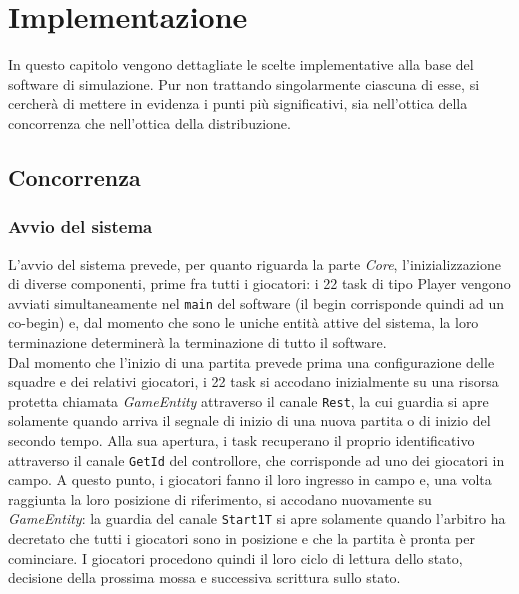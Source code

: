 
\section{Implementazione}
\label{sec:implementazione}

In questo capitolo vengono dettagliate le scelte implementative alla base del software di simulazione. Pur non trattando singolarmente ciascuna di esse, si cercherà di mettere in evidenza i punti più significativi, sia nell'ottica della concorrenza che nell'ottica della distribuzione.

\subsection{Concorrenza}
\label{sec:implemetazione_concorrenza}

\subsubsection{Avvio del sistema}
\label{sec:implementazione_concorrenza_avvio_sistema}

L'avvio del sistema prevede, per quanto riguarda la parte \emph{Core}, l'inizializzazione di diverse componenti, prime fra tutti i giocatori: i 22 task di tipo Player vengono avviati simultaneamente nel \verb+main+ del software (il begin corrisponde quindi ad un co-begin) e, dal momento che sono le uniche entità attive del sistema, la loro terminazione determinerà la terminazione di tutto il software.\\

Dal momento che l'inizio di una partita prevede prima una configurazione delle squadre e dei relativi giocatori, i 22 task si accodano inizialmente su una risorsa protetta chiamata \emph{GameEntity} attraverso il canale \verb+Rest+, la cui guardia si apre solamente quando arriva il segnale di inizio di una nuova partita o di inizio del secondo tempo. Alla sua apertura, i task recuperano il proprio identificativo attraverso il canale \verb+GetId+ del controllore, che corrisponde ad uno dei giocatori in campo. A questo punto, i giocatori fanno il loro ingresso in campo e, una volta raggiunta la loro posizione di riferimento, si accodano nuovamente su \emph{GameEntity}: la guardia del canale \verb+Start1T+ si apre solamente quando l'arbitro ha decretato che tutti i giocatori sono in posizione e che la partita è pronta per cominciare. I giocatori procedono quindi il loro ciclo di lettura dello stato, decisione della prossima mossa e successiva scrittura sullo stato.\\

